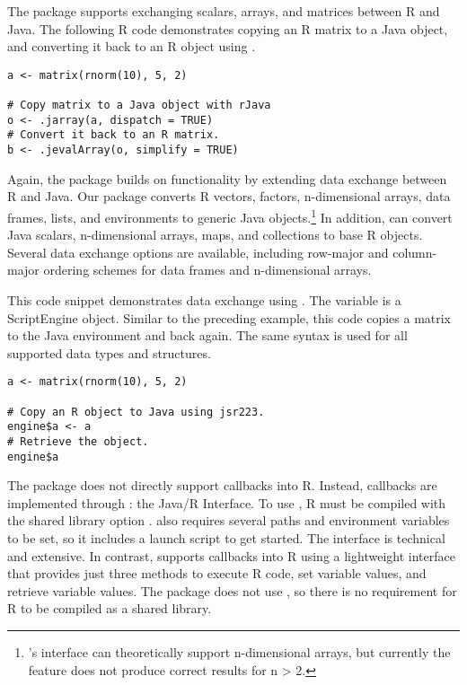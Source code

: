 The  package supports exchanging scalars, arrays, and matrices between R and Java. The following R code demonstrates copying an R matrix to a Java object, and converting it back to an R object using .

\begin{verbatim}
a <- matrix(rnorm(10), 5, 2)

# Copy matrix to a Java object with rJava
o <- .jarray(a, dispatch = TRUE)
# Convert it back to an R matrix.
b <- .jevalArray(o, simplify = TRUE)
\end{verbatim}

Again, the  package builds on  functionality by extending data exchange between R and Java. Our package converts R vectors, factors, n-dimensional arrays, data frames, lists, and environments to generic Java objects.\footnote{'s interface can theoretically support n-dimensional arrays, but currently the feature does not produce correct results for n > 2.} In addition,  can convert Java scalars, n-dimensional arrays, maps, and collections to base R objects. Several data exchange options are available, including row-major and column-major ordering schemes for data frames and n-dimensional arrays. %

This code snippet demonstrates data exchange using . The variable  is a  ScriptEngine object. Similar to the preceding  example, this code copies a matrix to the Java environment and back again. The same syntax is used for all supported data types and structures.

\begin{verbatim}
a <- matrix(rnorm(10), 5, 2)

# Copy an R object to Java using jsr223.
engine$a <- a
# Retrieve the object.
engine$a
\end{verbatim}

The  package does not directly support callbacks into R. Instead, callbacks are implemented through : the Java/R Interface. To use , R must be compiled with the shared library option .  also requires several paths and environment variables to be set, so it includes a launch script to get started. The  interface is technical and extensive. In contrast,  supports callbacks into R using a lightweight interface that provides just three methods to execute R code, set variable values, and retrieve variable values. The  package does not use , so there is no requirement for R to be compiled as a shared library.

